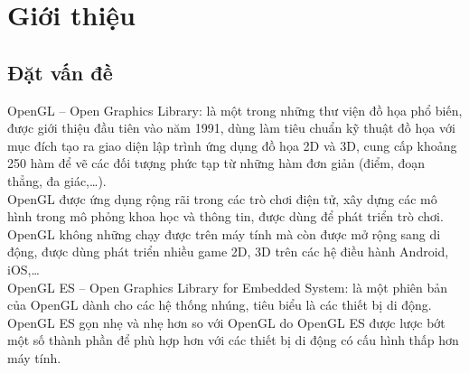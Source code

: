 \documentclass[13pt,a4paper]{extreport}
\begin{document}


\newpage 


\tableofcontents

\newpage

\listoffigures

\listoftables


\newpage

\chapter{Giới thiệu}
\section{Đặt vấn đề}
	OpenGL -- Open Graphics Library: là một trong những thư viện đồ họa phổ biến, được giới thiệu đầu tiên vào năm 1991, dùng làm tiêu chuẩn kỹ thuật đồ họa với mục đích tạo ra giao diện lập trình ứng dụng đồ họa 2D và 3D, cung cấp khoảng 250 hàm để vẽ các đối tượng phức tạp từ những hàm đơn giản (điểm, đoạn thẳng, đa giác,\ldots).\\
	
	OpenGL được ứng dụng rộng rãi trong các trò chơi điện tử, xây dựng các mô hình trong mô phỏng khoa học và thông tin, được dùng để phát triển trò chơi.\\
	
	OpenGL không những chạy được trên máy tính mà còn được mở rộng sang di động, được dùng phát triển nhiều game 2D, 3D trên các hệ điều hành Android, iOS,\ldots \\
	
	OpenGL ES -- Open Graphics Library for Embedded System: là một phiên bản của OpenGL dành cho các hệ thống nhúng, tiêu biểu là các thiết bị di động. OpenGL ES gọn nhẹ và nhẹ hơn so với OpenGL do OpenGL ES được lược bớt một số thành phần để phù hợp hơn với các thiết bị di động có cấu hình thấp hơn máy tính.\\
	
\end{document}
